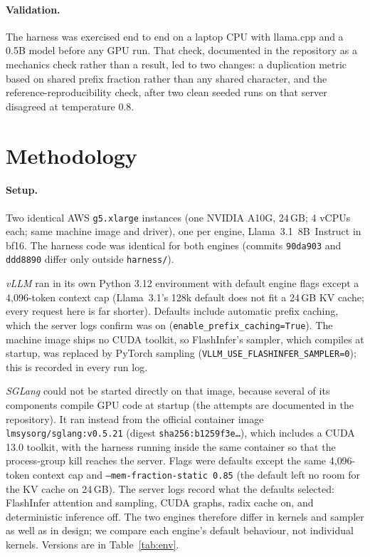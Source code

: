 \documentclass[10pt,twocolumn]{article}
\begin{document}
\paragraph{Validation.} The harness was exercised end to end on a laptop CPU
with llama.cpp and a 0.5B model before any GPU run. That check, documented in
the repository as a mechanics check rather than a result, led to two changes:
a duplication metric based on shared prefix fraction rather than any shared
character, and the reference-reproducibility check, after two clean seeded
runs on that server disagreed at temperature 0.8.

\section{Methodology}
\label{sec:method}

\paragraph{Setup.} Two identical AWS \texttt{g5.xlarge} instances (one
NVIDIA A10G, 24\,GB; 4 vCPUs each; same machine image and driver), one per
engine, Llama~3.1~8B~Instruct in bf16. The harness code was identical for
both engines (commits \texttt{90da903} and \texttt{ddd8890} differ only
outside \texttt{harness/}).

\emph{vLLM} ran in its own Python 3.12
environment with default engine flags except a 4{,}096-token context cap
(Llama~3.1's 128k default does not fit a 24\,GB KV cache; every request here
is far shorter). Defaults include automatic prefix caching, which the server
logs confirm was on (\texttt{enable\_prefix\_caching=True}). The machine
image ships no CUDA toolkit, so FlashInfer's sampler, which compiles at
startup, was replaced by PyTorch sampling
(\texttt{VLLM\_USE\_FLASHINFER\_SAMPLER=0}); this is recorded in every run log.

\emph{SGLang} could not be started directly on that image, because several
of its components compile GPU code at startup (the attempts are documented
in the repository). It ran instead from the official container image
\texttt{lmsysorg/sglang:v0.5.21} (digest \texttt{sha256:b1259f3e\dots}),
which includes a CUDA 13.0 toolkit, with the harness running inside the same
container so that the process-group kill reaches the server. Flags were
defaults except the same 4{,}096-token context cap and
\texttt{--mem-fraction-static 0.85} (the default left no room for the KV
cache on 24\,GB). The server logs record what the defaults selected:
FlashInfer attention and sampling, CUDA graphs, radix cache on, and
deterministic inference off. The two engines therefore differ in kernels
and sampler as well as in design; we compare each engine's default
behaviour, not individual kernels. Versions are in Table~\ref{tab:env}.
\end{document}
